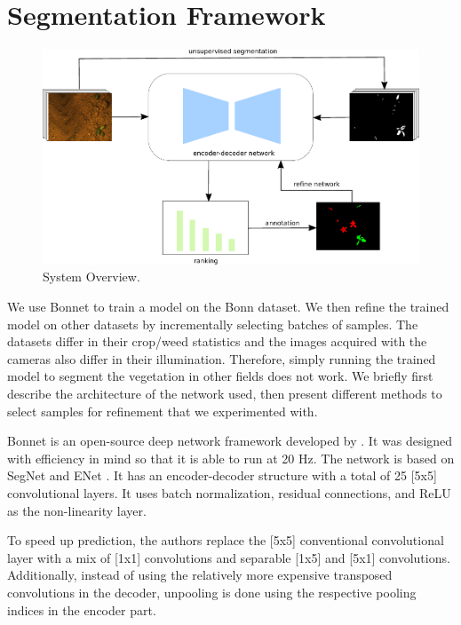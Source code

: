 \documentclass[letterpaper, 10 pt, conference]{ieeeconf}  %
\begin{document}
\section{Segmentation Framework} \label{sec:approach}


    \begin{figure}
    \centering
    \includegraphics[scale=0.9]{pics/output_system_overview.pdf}
   		\caption{System Overview.}
		\label{fig:overview}    		
   \end{figure}


We use Bonnet \cite{milioto2018bonnet} to train a model on the Bonn dataset. We then refine the trained model on other datasets by incrementally selecting batches of samples. The datasets differ in their crop/weed statistics and the images acquired with the cameras also differ in their illumination. Therefore, simply running the trained model to segment the vegetation in other fields does not work. We briefly first describe the architecture of the network used, then present different methods to select samples for refinement that we experimented with.


Bonnet is an open-source deep network framework developed by \cite{milioto2018bonnet}. It was designed with efficiency in mind so that it is able to run at 20 Hz. The network is based on SegNet \cite{badrinarayanan2017segnet} and ENet \cite{paszke2016enet}. It has an encoder-decoder structure with a total of 25 [5x5] convolutional layers. It uses batch normalization, residual connections, and ReLU as the non-linearity layer. 

To speed up prediction, the authors replace the [5x5] conventional convolutional layer with a mix of [1x1] convolutions and separable [1x5] and [5x1] convolutions. Additionally, instead of using the relatively more expensive transposed convolutions in the decoder, unpooling is done using the respective pooling indices in the encoder part.
\end{document}
